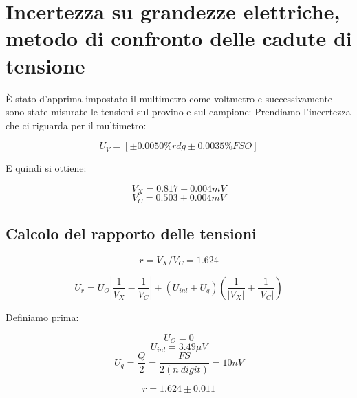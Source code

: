 \documentclass[a4paper]{article}
\begin{document}
\section {Incertezza su grandezze elettriche, metodo di confronto delle cadute di tensione}
È stato d'apprima impostato il multimetro come voltmetro e successivamente sono state misurate le tensioni sul provino e sul campione:
Prendiamo l'incertezza che ci riguarda per il multimetro:

\begin{Large} 
	\begin{equation}
		U_{V} = [\pm 0.0050\%rdg \pm 0.0035\% FSO]
	 \end{equation}
\end{Large}
E quindi si ottiene:
\begin{Large} 
	\begin{equation}
		V_X = 0.817 \pm 0.004 mV
	 \end{equation}
	 \begin{equation}
		V_C = 0.503 \pm 0.004 mV
	 \end{equation}
\end{Large}
\subsection{Calcolo del rapporto delle tensioni}
\begin{Large}
	\begin{equation}
		r = {V_X}/{V_C}= 1.624
	 \end{equation}
\end{Large}
\begin{Large} 
	 \begin{equation}
		U_{r} = U_{O}|\frac{1}{V_X}-\frac{1}{V_C}|+(U_{inl}+U_q)(\frac{1}{|V_X|}+\frac{1}{|V_C|})
	 \end{equation}
\end{Large}
Definiamo prima:
\begin{Large}
	\begin{equation}
		U_O= 0
	 \end{equation}
	 \begin{equation}
		U_{inl} = 3.49 \mu V
	 \end{equation}
	 \begin{equation}
		U_{q} = \frac{Q}{2}= \frac{FS}{2(n\ digit)}=10nV
	 \end{equation}
\end{Large}
\begin{Large} 
	\begin{equation}
		r = 1.624 \pm 0.011
	 \end{equation}
\end{Large}
\end{document}
